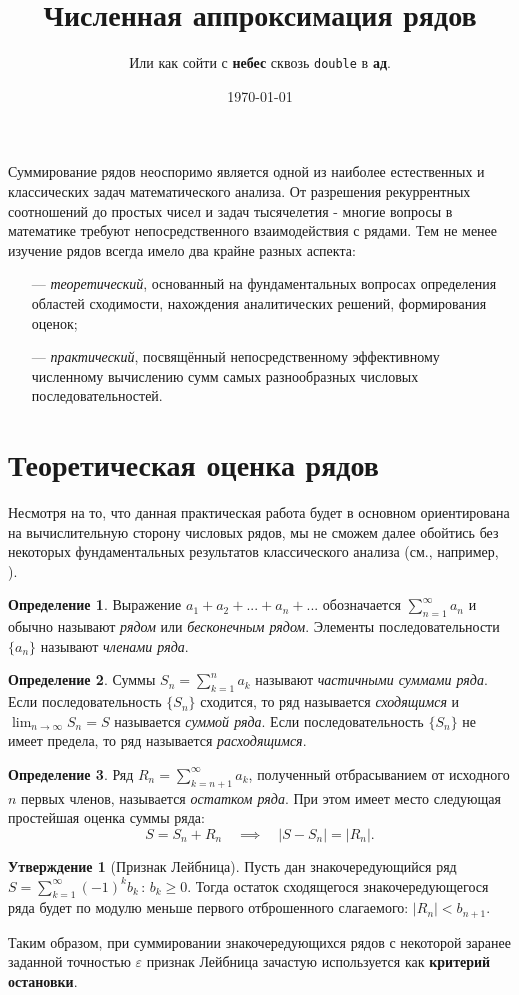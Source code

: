 \documentclass{article}
\title{\textbf{Численная аппроксимация рядов}}
\author{Или как сойти с \textbf{небес} сквозь \texttt{double} в \textbf{ад}.}
\date{\today}
\theoremstyle{definition}
\newtheorem*{definition}{Определение}
\newtheorem*{statement}{Утверждение}
\begin{document}
\maketitle
Суммирование рядов неоспоримо является одной из наиболее естественных и классических задач математического анализа. От разрешения рекуррентных соотношений до простых чисел и задач тысячелетия - многие вопросы в математике требуют непосредственного взаимодействия с рядами. Тем не менее изучение рядов всегда имело два крайне разных аспекта: 
\begin{itemize}
\item[---] \textit{теоретический}, основанный на фундаментальных вопросах определения областей сходимости, нахождения аналитических решений, формирования оценок;
\item[---] \textit{практический}, посвящённый непосредственному эффективному численному вычислению сумм самых разнообразных числовых последовательностей.
\end{itemize}
\section{Теоретическая оценка рядов}
Несмотря на то, что данная практическая работа будет в основном ориентирована на вычислительную сторону числовых рядов, мы не сможем далее обойтись без некоторых фундаментальных результатов классического анализа (см., например, \cite{Zorich}).
\begin{definition}
Выражение $a_1 + a_2 + ... + a_n + ...$ обозначается $\sum_{n=1}^\infty a_n$ и обычно называют \textit{рядом} или \textit{бесконечным рядом}. Элементы последовательности $\{a_n\}$ называют \textit{членами ряда}.
\end{definition}
\begin{definition}
Суммы $S_n = \sum_{k=1}^n a_k$ называют \textit{частичными суммами ряда}. Если последовательность $\{S_n\}$ сходится, то ряд называется \textit{сходящимся} и $\lim_{n\rightarrow\infty}S_n = S$ называется \textit{суммой ряда}. Если последовательность $\{S_n\}$ не имеет предела, то ряд называется \textit{расходящимся}. 
\end{definition}
\begin{definition}
Ряд $R_n = \sum_{k=n+1}^\infty a_k$, полученный отбрасыванием от исходного $n$ первых членов, называется \textit{остатком ряда}. При этом имеет место следующая простейшая оценка суммы ряда:
\begin{equation*}
S = S_n + R_n \quad\implies\quad |S - S_n| = |R_n|. 
\end{equation*} 
\end{definition}
\begin{statement}[Признак Лейбница]
Пусть дан знакочередующийся ряд $S=\sum_{k=1}^\infty (-1)^k b_k \,:\, b_k \geq 0$. Тогда остаток сходящегося знакочередующегося ряда будет по модулю меньше первого отброшенного слагаемого: $|R_n| < b_{n+1}$.
\end{statement} \noindent
Таким образом, при суммировании знакочередующихся рядов с некоторой заранее заданной точностью $\varepsilon$ признак Лейбница зачастую используется как  \textbf{критерий остановки}.
\lstset{style=inline_style}
\end{document}
